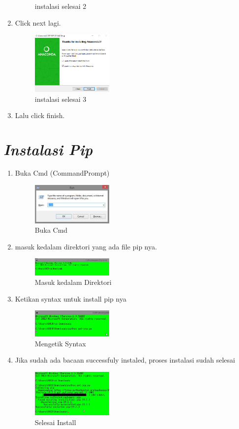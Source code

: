 \begin{enumerate}
\begin{figure}[h]
			\centering
			\caption{instalasi selesai 2}
			\end{figure}
		\item Click next lagi.	
			\begin{figure}[h]
			\includegraphics[width=4cm]{figure/10.png}
			\centering
			\caption{instalasi selesai 3}
			\end{figure}
		\item Lalu click finish.	
	\end{enumerate}

\section*{\textit{ Instalasi Pip }}
\begin{enumerate}
\item Buka Cmd (CommandPrompt)
\begin{figure}[h]
\includegraphics[width=4cm]{figure/pip1.png}
\centering
\caption{Buka Cmd}
\end{figure}
\item masuk kedalam direktori yang ada file pip nya.
\begin{figure}[h]
\includegraphics[width=4cm]{figure/pip2.png}
\centering
\caption{Masuk kedalam Direktori}
\end{figure}
\item Ketikan syntax untuk install pip nya
\begin{figure}[h]
\includegraphics[width=4cm]{figure/pip3.png}
\centering
\caption{Mengetik Syntax}
\end{figure}
\item Jika sudah ada bacaan successfuly instaled, proses instalasi sudah selesai
\begin{figure}[h]
\includegraphics[width=4cm]{figure/pip4.png}
\centering
\caption{Selesai Install}
\end{figure}
\end{enumerate}

